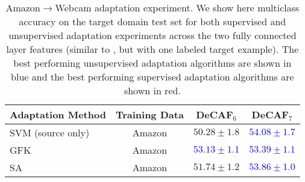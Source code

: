 \begin{table*}
\centering
\begin{tabular}{lccc}
\toprule
Adaptation Method & Training Data & DeCAF$_6$ & DeCAF$_7$ \\
\midrule
SVM (source only) & Amazon & $50.28 \pm 1.8$ & \textcolor{blue}{$\bm{54.08 \pm 1.7}$} \\
\midrule
GFK \cite{gong-cvpr12} & Amazon & \textcolor{blue}{$\bm{53.13 \pm 1.1}$} & \textcolor{blue}{$\bm{53.39 \pm 1.1}$} \\
SA \cite{sa} & Amazon & $51.74 \pm 1.2$ & \textcolor{blue}{$\bm{53.86 \pm 1.0}$ }\\
\bottomrule
\end{tabular}

\caption{Amazon$\rightarrow$Webcam adaptation experiment. We show here
  multiclass accuracy on the target domain test set for both supervised and
  unsupervised adaptation experiments across the two fully connected layer
  features (similar to \cite{deeplearning-arxiv-2013}, but with one labeled
  target example). The best performing unsupervised adaptation algorithms are
  shown in blue and the best performing supervised adaptation algorithms are
  shown in red.}


\label{tab:fc6and7_amazon_unsup}
\end{table*}
